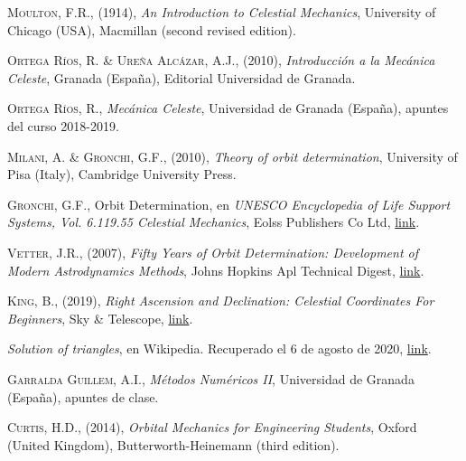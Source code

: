 \documentclass[11pt]{book}
\begin{document}
\begin{thebibliography}{99}
 \textsc{Moulton, F.R.}, (1914), \textit{An Introduction to Celestial Mechanics}, University of Chicago (USA), Macmillan (second revised edition).

 \textsc{Ortega Ríos, R. \& Ureña Alcázar, A.J.}, (2010), \textit{Introducción a la Mecánica Celeste}, Granada (España), Editorial Universidad de Granada.

 \textsc{Ortega Ríos, R.}, \textit{Mecánica Celeste}, Universidad de Granada (España), apuntes del curso 2018-2019.

 \textsc{Milani, A. \& Gronchi, G.F.}, (2010), \textit{Theory of
orbit determination}, University of Pisa (Italy), Cambridge University Press.

 \textsc{Gronchi, G.F.}, Orbit Determination, en \textit{UNESCO Encyclopedia of Life Support Systems, Vol. 6.119.55 Celestial Mechanics}, Eolss Publishers Co Ltd, \href{http://adams.dm.unipi.it/~gronchi/PDF/gronchi_unesco.pdf}{link}.

 \textsc{Vetter, J.R.}, (2007), \textit{Fifty Years of Orbit Determination: Development of Modern Astrodynamics Methods}, Johns Hopkins Apl Technical Digest, \href{https://www.jhuapl.edu/Content/techdigest/pdf/V27-N03/27-03-Vetter.pdf}{link}.

 \textsc{King, B.}, (2019), \textit{Right Ascension and Declination: Celestial Coordinates For Beginners}, Sky \& Telescope, \href{https://skyandtelescope.org/astronomy-resources/right-ascension-declination-celestial-coordinates/}{link}.

 \textit{Solution of triangles}, en Wikipedia. Recuperado el 6 de agosto de 2020, \href{https://en.wikipedia.org/wiki/Solution_of_triangles#A_side_and_two_adjacent_angles_given_(ASA)}{link}.

 \textsc{Garralda Guillem, A.I.}, \textit{Métodos Numéricos II}, Universidad de Granada (España), apuntes de clase.

 \textsc{Curtis, H.D.}, (2014), \textit{Orbital Mechanics for Engineering Students}, Oxford (United Kingdom), Butterworth-Heinemann (third edition).
\end{thebibliography}
\end{document}
